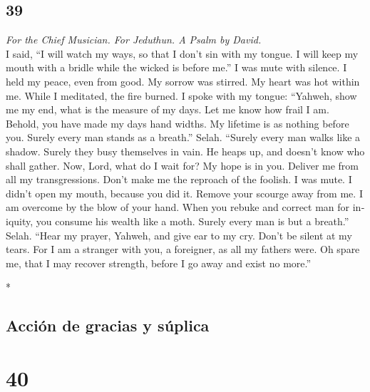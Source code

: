 \begin{paracol}{2}
\switchcolumn
\begin{otherlanguage}{english}

\hypertarget{section-77}{%
\section{39}\label{section-77}}

\emph{For the Chief Musician. For Jeduthun. A Psalm by David.}\\
 I said, ``I will watch my ways, so that I don't sin with
my tongue. I will keep my mouth with a bridle while the wicked is before
me.''  I was mute with silence. I held my peace, even from
good. My sorrow was stirred.  My heart was hot within me.
While I meditated, the fire burned. I spoke with my tongue:
 ``Yahweh, show me my end, what is the measure of my days.
Let me know how frail I am.  Behold, you have made my days
hand widths. My lifetime is as nothing before you. Surely every man
stands as a breath.'' Selah.  ``Surely every man walks
like a shadow. Surely they busy themselves in vain. He heaps up, and
doesn't know who shall gather.  Now, Lord, what do I wait
for? My hope is in you.  Deliver me from all my
transgressions. Don't make me the reproach of the foolish.
 I was mute. I didn't open my mouth, because you did it.
 Remove your scourge away from me. I am overcome by the
blow of your hand.  When you rebuke and correct man for
iniquity, you consume his wealth like a moth. Surely every man is but a
breath.'' Selah.  ``Hear my prayer, Yahweh, and give ear
to my cry. Don't be silent at my tears. For I am a stranger with you, a
foreigner, as all my fathers were.  Oh spare me, that I
may recover strength, before I go away and exist no more.''

\end{otherlanguage}

\switchcolumn[0]*

\hypertarget{acciuxf3n-de-gracias-y-suxfaplica}{%
\subsection{Acción de gracias y
súplica}\label{acciuxf3n-de-gracias-y-suxfaplica}}

\hypertarget{section-78}{%
\section{40}\label{section-78}}


\end{paracol}
